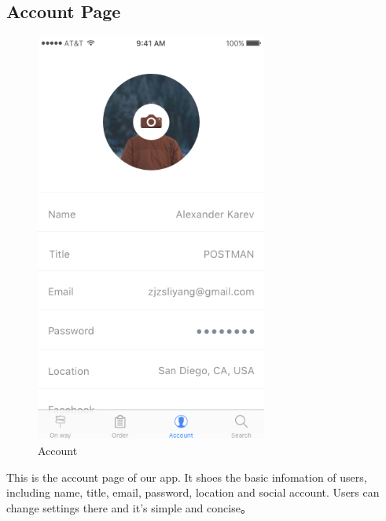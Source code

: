 \documentclass[12pt]{scrreprt}
\begin{document}
\subsection{Account Page}
\begin{figure}[htbp]
  \centering\includegraphics[width=3in]{DocumentRes/Account.png}
  \caption{Account}
\end{figure}
This is the account page of our app. It shoes the basic infomation of users,
including name, title, email, password, location and social account. Users can
change settings there and it's simple and concise。
\end{document}
